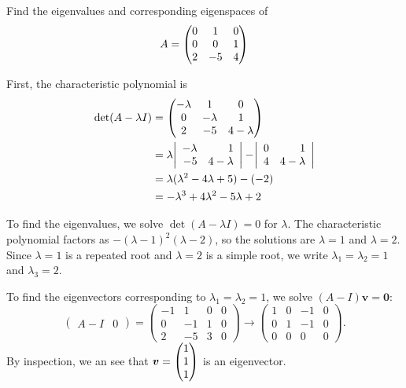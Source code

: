 \begin{eg}
	Find the eigenvalues and corresponding eigenspaces of
	\[
	A = \begin{pmatrix}0 & 1 & 0 \\ 0 & 0 & 1 \\ 2 & -5 & 4\end{pmatrix}
	\]
	
	First, the characteristic polynomial is
	\begin{align*}
		\det(A - \lambda I) &= \begin{pmatrix}-\lambda & 1 & 0 \\ 0 & -\lambda & 1 \\ 2 & -5 & 4-\lambda\end{pmatrix} \\
		&= \lambda \abs{\begin{array}{rr}-\lambda & 1 \\ -5 & 4-\lambda\end{array}} - \abs{\begin{array}{rr}0 & 1 \\ 4 & 4-\lambda\end{array}} \\
		&= \lambda(\lambda^2 - 4\lambda +5) - (-2) \\
		&= -\lambda^3 + 4\lambda^2 - 5\lambda + 2
	\end{align*}
	
	To find the eigenvalues, we solve $\det(A-\lambda I) =0$ for $\lambda$. The characteristic polynomial factors as $-(\lambda-1)^2(\lambda-2)$, so the solutions are $\lambda=1$ and $\lambda=2$. Since $\lambda=1$ is a repeated root and $\lambda=2$ is a simple root, we write $\lambda_1 = \lambda_2 = 1$ and $\lambda_3 = 2$.
	
	To find the eigenvectors corresponding to $\lambda_1 = \lambda_2 = 1$, we solve $(A-I)\bm{v} = \bm{0}$:
	\[
	\left(\begin{array}{r|r}A-I & 0\end{array}\right) = \left(\begin{array}{rrr|r}-1 & 1 & 0 & 0\\ 0 & -1 & 1 & 0 \\ 2 & -5 & 3 & 0\end{array}\right) \rightarrow \left(\begin{array}{rrr|r}1 & 0 & -1 & 0\\ 0 & 1 & -1 & 0 \\ 0 & 0 & 0 & 0\end{array}\right).
	\]
	By inspection, we an see that $\bm{v} = \begin{pmatrix}1\\1\\1\end{pmatrix}$ is an eigenvector.
	

\end{eg}
